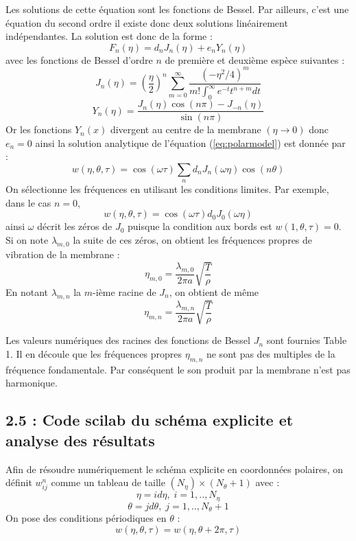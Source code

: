 \documentclass[a4,12pt]{article}
\begin{document}
				Les solutions de cette équation sont les fonctions de Bessel. Par ailleurs, c'est une équation du second ordre il existe donc deux solutions linéairement indépendantes. La solution est donc de la forme :
				\[
				  F_n(\eta)=d_nJ_n(\eta)+e_nY_n(\eta)
				\]
				avec les fonctions de Bessel d'ordre $n$ de première et deuxième espèce suivantes :
				\[
				  J_n(\eta)=\left(\dfrac{\eta}{2}\right)^n\sum_{m=0}^{\infty} \dfrac{(-\eta^2/4)^m}{m!\int_0^{\infty}e^{-t}t^{n+m}dt}
				\]
				\[
				  Y_n(\eta)=\dfrac{J_n(\eta)\cos(n\pi)-J_{-n}(\eta)}{\sin(n\pi)}
				\]
				Or les fonctions $Y_n(x)$ divergent au centre de la membrane $(\eta\rightarrow 0)$ donc $e_n=0$
				ainsi la solution analytique de l'équation (\ref{eq:polarmodel}) est donnée par :
				\[
				  w(\eta,\theta,\tau)=\cos(\omega \tau)\sum_n d_nJ_n(\omega\eta)\cos(n\theta)
				\]
				On sélectionne les fréquences en utilisant les conditions limites. Par exemple, dans le cas $n=0$, 
				\[
				  w(\eta,\theta,\tau)=\cos(\omega \tau) d_0J_0(\omega \eta)
				\]
				ainsi $\omega$ décrit les zéros de $J_0$ puisque la condition aux bords est $w(1,\theta,\tau)=0$. Si on note $\lambda_{m,0}$ la suite de ces zéros, on obtient les fréquences propres de vibration de la membrane :
				\[
				  \eta_{m,0}=\dfrac{\lambda_{m,0}}{2\pi a} \sqrt{\frac{T}{\rho}}
				\]
				En notant $\lambda_{m,n}$ la $m$-ième racine de $J_n$, on obtient de même 
				\[
				  \eta_{m,n}=\dfrac{\lambda_{m,n}}{2\pi a} \sqrt{\frac{T}{\rho}}
				\]

				Les valeurs numériques des racines des fonctions de Bessel $J_n$ sont fournies Table 1. Il en découle que les fréquences propres $\eta_{m,n}$ ne sont pas des multiples de la fréquence fondamentale. Par conséquent le son produit par la membrane n'est pas harmonique.

				\newpage 

				\subsection*{2.5 : Code scilab du schéma explicite et analyse des résultats}

				Afin de résoudre numériquement le schéma explicite en coordonnées polaires, on définit $w_{ij}^n$ comme un tableau de taille $(N_\eta)\times(N_\theta+1)$ avec :
				\[
				  \eta=id\eta ,\;i=1,..,N_\eta
				\]
				\[
				  \theta=jd\theta ,\;j=1,..,N_\theta+1
				\]
				On pose des conditions périodiques en $\theta$ :
				\[
				  w(\eta,\theta,\tau)=w(\eta,\theta+2\pi,\tau)
				\]
\end{document}

